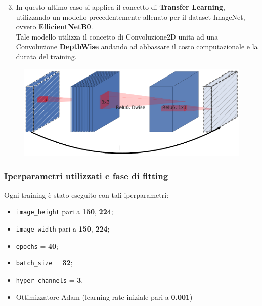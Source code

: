 \documentclass{beamer}
\begin{document}
	
\begin{frame}
	
	\begin{enumerate}
		\setcounter{enumi}{2}
		\item In questo ultimo caso si applica il concetto di \textbf{Transfer Learning}, utilizzando un modello precedentemente allenato per il dataset ImageNet,
		ovvero \textbf{EfficientNetB0}.\\
		Tale modello utilizza il concetto di Convoluzione2D unita ad una Convoluzione \textbf{DepthWise} andando ad abbassare il costo computazionale e la durata del training.
	\end{enumerate}
		\begin{figure}
			\includegraphics[width=1\textwidth]{efficientnet.png}
		\end{figure}
		
	
\end{frame}


\begin{frame}[fragile]
	\frametitle{Iperparametri utilizzati e fase di fitting}
		Ogni training è stato eseguito con tali iperparametri:
		\begin{itemize}
			\item \lstinline[language = Python]{image_height} pari a \textbf{150}, \textbf{224};
			\item \lstinline[language = Python]{image_width} pari a \textbf{150}, \textbf{224};
			\item \lstinline[language = Python]{epochs} = \textbf{40};
			\item \lstinline[language = Python]{batch_size} = \textbf{32};
			\item \lstinline[language = Python]{hyper_channels} = \textbf{3}.
			\item Ottimizzatore Adam (learning rate iniziale pari a \textbf{0.001})
		\end{itemize}
\end{frame}
\end{document}
